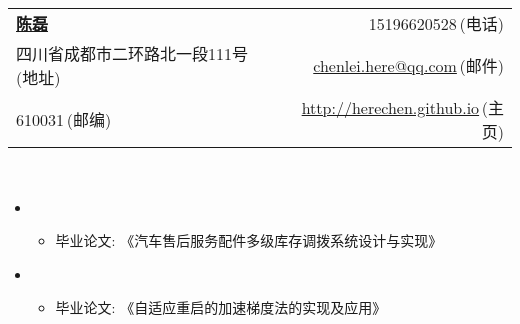 \documentclass[letterpaper,11pt]{article}
\begin{document}

\newcommand{\myheader}{
\begin{tabular*}{7.0in}{l@{\extracolsep{\fill}}r}
  \textbf{\href{http://herechen.github.io}{\LARGE 陈磊}} & 15196620528$\,${\color{labelgrey}(电话)} \\
  四川省成都市二环路北一段111号$\,${\color{labelgrey}(地址)} & \href{mailto:chenlei.here@qq.com}{chenlei.here@qq.com}$\,${\color{labelgrey}(邮件)} \\
  610031$\,${\color{labelgrey}(邮编)} & \href{http://herechen.github.io}{http://herechen.github.io}$\,${\color{labelgrey}(主页)} \\
  \end{tabular*}\\\vspace{0.1in}}

\myheader

  \begin{itemize}
    \item
      {\footnotesize
      \begin{itemize}
        \item 毕业论文: 《汽车售后服务配件多级库存调拨系统设计与实现》
      \end{itemize}
      }
    \item
      {\footnotesize
      \begin{itemize}
        \item 毕业论文: 《自适应重启的加速梯度法的实现及应用》
      \end{itemize}
      }
  \end{itemize}
\end{document}
